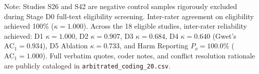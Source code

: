 \begin{table}[!t]
\begin{tabularx}{\textwidth}{llp{4.2cm}cccccc}
\bottomrule
\end{tabularx}
\begin{tablenotes}[flushleft]\footnotesize
\item Note: Studies S26 and S42 are negative control samples rigorously excluded during Stage D0 full-text eligibility screening. Inter-rater agreement on eligibility achieved 100\% ($\kappa = 1.000$). Across the 18 eligible studies, inter-rater reliability achieved: D1 $\kappa = 1.000$, D2 $\kappa = 0.907$, D3 $\kappa = 0.684$, D4 $\kappa = 0.640$ (Gwet's $\mathrm{AC}_1 = 0.934$), D5 Ablation $\kappa = 0.733$, and Harm Reporting $P_o = 100.0\%$ ($\mathrm{AC}_1 = 1.000$). Full verbatim quotes, coder notes, and conflict resolution rationale are publicly cataloged in \texttt{arbitrated\_coding\_20.csv}.
\end{tablenotes}
\end{table}